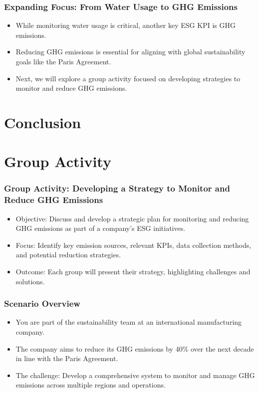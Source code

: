 \documentclass{beamer}
\begin{document}
\begin{frame}
\frametitle{Expanding Focus: From Water Usage to GHG Emissions}
\begin{itemize}
    \item While monitoring water usage is critical, another key ESG KPI is GHG emissions.
    \item Reducing GHG emissions is essential for aligning with global sustainability goals like the Paris Agreement.
    \item Next, we will explore a group activity focused on developing strategies to monitor and reduce GHG emissions.
\end{itemize}
\end{frame}

\section{Conclusion}



\section{Group Activity}

\begin{frame}
\frametitle{Group Activity: Developing a Strategy to Monitor and Reduce GHG Emissions}
\begin{itemize}
    \item Objective: Discuss and develop a strategic plan for monitoring and reducing GHG emissions as part of a company's ESG initiatives.
    \item Focus: Identify key emission sources, relevant KPIs, data collection methods, and potential reduction strategies.
    \item Outcome: Each group will present their strategy, highlighting challenges and solutions.
\end{itemize}
\end{frame}

\begin{frame}
\frametitle{Scenario Overview}
\begin{itemize}
    \item You are part of the sustainability team at an international manufacturing company.
    \item The company aims to reduce its GHG emissions by 40\% over the next decade in line with the Paris Agreement.
    \item The challenge: Develop a comprehensive system to monitor and manage GHG emissions across multiple regions and operations.
\end{itemize}
\end{frame}
\end{document}

